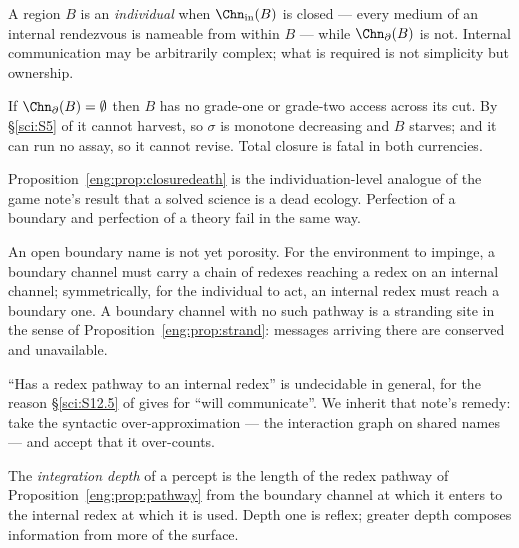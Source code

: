 \begin{definition}[Individual]\label{eng:def:indiv}
A region $B$ is an \emph{individual} when $\Chn_{\mathrm{in}}(B)$ is closed
--- every medium of an internal rendezvous is nameable from within $B$ ---
while $\Chn_{\partial}(B)$ is not. Internal communication may be
arbitrarily complex; what is required is not simplicity but ownership.
\end{definition}

\begin{proposition}\label{eng:prop:closuredeath}
If $\Chn_{\partial}(B) = \emptyset$ then $B$ has no grade-one or grade-two
access across its cut. By \S\ref{sci:S5} of \chSci it cannot harvest, so
$\sigma$ is monotone decreasing and $B$ starves; and it can run no assay,
so it cannot revise. Total closure is fatal in both currencies.
\end{proposition}

Proposition~\ref{eng:prop:closuredeath} is the individuation-level analogue of
the game note's result that a solved science is a dead ecology. Perfection
of a boundary and perfection of a theory fail in the same way.

\begin{proposition}\label{eng:prop:pathway}
An open boundary name is not yet porosity. For the environment to impinge,
a boundary channel must carry a chain of redexes reaching a redex on an
internal channel; symmetrically, for the individual to act, an internal
redex must reach a boundary one. A boundary channel with no such pathway is
a stranding site in the sense of Proposition~\ref{eng:prop:strand}: messages
arriving there are conserved and unavailable.
\end{proposition}

\begin{remark}\label{eng:same-undecidability-same-remedy}
``Has a redex pathway to an internal redex'' is undecidable in general, for
the reason \S\ref{sci:S12.5} of \chSci gives for ``will communicate''. We
inherit that note's remedy: take the syntactic over-approximation --- the
interaction graph on shared names --- and accept that it over-counts.
\end{remark}

\begin{definition}\label{eng:integration-depth}
The \emph{integration depth} of a percept is the length of the redex
pathway of Proposition~\ref{eng:prop:pathway} from the boundary channel at
which it enters to the internal redex at which it is used. Depth one is
reflex; greater depth composes information from more of the surface.
\end{definition}

